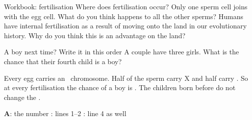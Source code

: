 \documentclass[aspectratio=169,11pt,xcolor=table]{beamer}
\begin{document}
\begin{frame}{Workbook: fertilisation}
\relax
{} Where does fertilisation occur?
 Only one sperm cell joins with the egg cell. What do you think happens to all the other sperms?
 Humans have internal fertilisation as a result of moving onto the land in our evolutionary history. Why do you think this is an advantage on the land?
\end{frame}

\begin{frame}{A boy next time? Write it in this order}
\relax
A couple have three girls. What is the chance that their fourth child is a boy?\par\vspace{1mm}
 Every egg carries an \gap\ chromosome.
 Half of the sperm carry X and half carry \gap.
 So at every fertilisation the chance of a boy is \gap[18mm].
 The children born before do not change the \gap[20mm].
\par\vspace{2mm}
{\bfseries A}: the number : lines 1--2 : line 4 as well
\end{frame}
\end{document}
